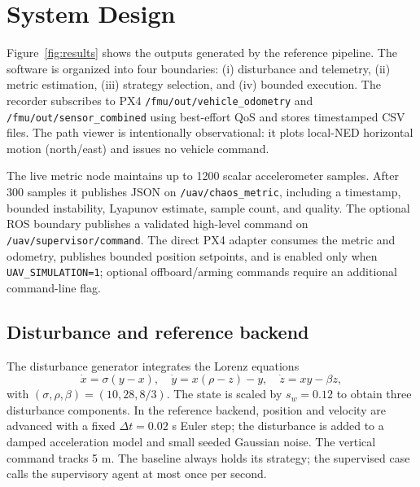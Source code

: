 \documentclass[10pt,conference]{IEEEtran}
\begin{document}
\section{System Design}
Figure~\ref{fig:results} shows the outputs generated by the reference pipeline.
The software is organized into four boundaries: (i) disturbance and telemetry,
(ii) metric estimation, (iii) strategy selection, and (iv) bounded execution.
The recorder subscribes to PX4 \texttt{/fmu/out/vehicle\_odometry} and
\texttt{/fmu/out/sensor\_combined} using best-effort QoS and stores timestamped
CSV files. The path viewer is intentionally observational: it plots local-NED
horizontal motion (north/east) and issues no vehicle command.

The live metric node maintains up to 1200 scalar accelerometer samples. After
300 samples it publishes JSON on \texttt{/uav/chaos\_metric}, including a
timestamp, bounded instability, Lyapunov estimate, sample count, and quality.
The optional ROS boundary publishes a validated high-level command on
\texttt{/uav/supervisor/command}. The direct PX4 adapter consumes the metric and
odometry, publishes bounded position setpoints, and is enabled only when
\texttt{UAV\_SIMULATION=1}; optional offboard/arming commands require an
additional command-line flag.

\subsection{Disturbance and reference backend}
The disturbance generator integrates the Lorenz equations\cite{lorenz}
\begin{equation}
 \dot{x}=\sigma(y-x),\quad \dot{y}=x(\rho-z)-y,\quad
 \dot{z}=xy-\beta z,
 \label{eq:lorenz}
\end{equation}
with $(\sigma,\rho,\beta)=(10,28,8/3)$. The state is scaled by
$s_w=0.12$ to obtain three disturbance components. In the reference backend,
position and velocity are advanced with a fixed $\Delta t=0.02$ s Euler step;
the disturbance is added to a damped acceleration model and small seeded
Gaussian noise. The vertical command tracks 5 m. The baseline always holds its
strategy; the supervised case calls the supervisory agent at most once per
second.
\end{document}
